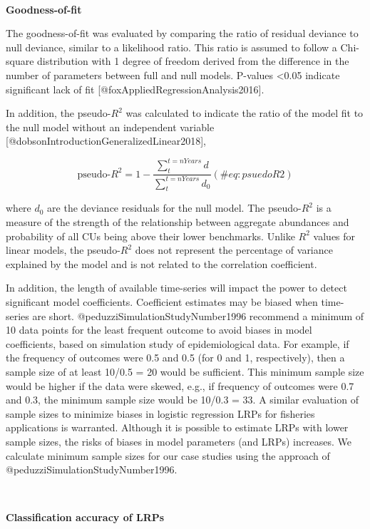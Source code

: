 \documentclass[
]{article}
\begin{document}
~

\textbf{Goodness-of-fit}

The goodness-of-fit was evaluated by comparing the ratio of residual
deviance to null deviance, similar to a likelihood ratio. This ratio is
assumed to follow a Chi-square distribution with 1 degree of freedom
derived from the difference in the number of parameters between full and
null models. P-values \textless0.05 indicate significant lack of fit
{[}@foxAppliedRegressionAnalysis2016{]}.

In addition, the pseudo-\(R^2\) was calculated to indicate the ratio of
the model fit to the null model without an independent variable
{[}@dobsonIntroductionGeneralizedLinear2018{]},

\begin{equation}
   \text{pseudo-}R^2 =  1- \frac{\sum_{t}^{t=nYears} d}{\sum_{t}^{t=nYears} d_0} 
   (\#eq:psuedoR2)
\end{equation}

where \(d_0\) are the deviance residuals for the null model. The
pseudo-\(R^2\) is a measure of the strength of the relationship between
aggregate abundances and probability of all CUs being above their lower
benchmarks. Unlike \(R^2\) values for linear models, the pseudo-\(R^2\)
does not represent the percentage of variance explained by the model and
is not related to the correlation coefficient.

In addition, the length of available time-series will impact the power
to detect significant model coefficients. Coefficient estimates may be
biased when time-series are short. @peduzziSimulationStudyNumber1996
recommend a minimum of 10 data points for the least frequent outcome to
avoid biases in model coefficients, based on simulation study of
epidemiological data. For example, if the frequency of outcomes were 0.5
and 0.5 (for 0 and 1, respectively), then a sample size of at least
10/0.5 = 20 would be sufficient. This minimum sample size would be
higher if the data were skewed, e.g., if frequency of outcomes were 0.7
and 0.3, the minimum sample size would be 10/0.3 = 33. A similar
evaluation of sample sizes to minimize biases in logistic regression
LRPs for fisheries applications is warranted. Although it is possible to
estimate LRPs with lower sample sizes, the risks of biases in model
parameters (and LRPs) increases. We calculate minimum sample sizes for
our case studies using the approach of
@peduzziSimulationStudyNumber1996.

~

\textbf{Classification accuracy of LRPs}
\end{document}
